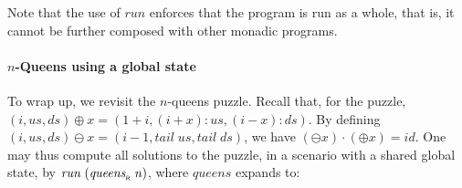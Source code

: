 \documentclass{llncs}
\newcommand{\Varid}[1]{\mathit{#1}}
\let\Varid\mathit
\begin{document}
Note that the use of \ensuremath{\Varid{run}} enforces that the program is run as a whole, that is, it cannot be further composed with other monadic programs.



\paragraph{\ensuremath{\Varid{n}}-Queens using a global state}
To wrap up, we revisit the \ensuremath{\Varid{n}}-queens puzzle.
Recall that, for the puzzle, \ensuremath{(\Varid{i},\Varid{us},\Varid{ds})\mathbin{\oplus}\Varid{x}\mathrel{=}(\mathrm{1}\mathbin{+}\Varid{i},(\Varid{i}\mathbin{+}\Varid{x})\mathbin{:}\Varid{us},(\Varid{i}\mathbin{-}\Varid{x})\mathbin{:}\Varid{ds})}.
By defining \ensuremath{(\Varid{i},\Varid{us},\Varid{ds})\mathbin{\ominus}\Varid{x}\mathrel{=}(\Varid{i}\mathbin{-}\mathrm{1},\Varid{tail}\;\Varid{us},\Varid{tail}\;\Varid{ds})},
we have \ensuremath{(\mathbin{\ominus}\Varid{x})\mathbin{\cdot}(\mathbin{\oplus}\Varid{x})\mathrel{=}\Varid{id}}.
One may thus compute all solutions to the puzzle,
in a scenario with a shared global state, by \ensuremath{\Varid{run}\;(\Varid{queens}_{\scaleobj{0.7}{\sf R}}\;\Varid{n})},
where \ensuremath{\Varid{queens}} expands to:
\end{document}
